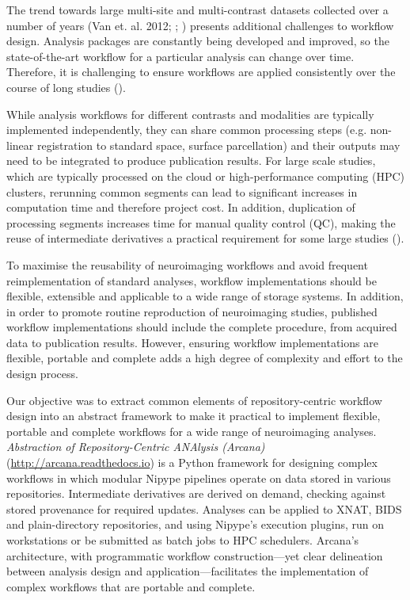 The trend towards large multi-site and multi-contrast datasets collected
over a number of years (Van et. al. 2012; \cite{thompson_enigma_2014};
\cite{sudlow_uk_2015}) presents additional challenges to workflow design.
Analysis packages are constantly being developed and improved, so the
state-of-the-art workflow for a particular analysis can change over
time. Therefore, it is challenging to ensure workflows are applied
consistently over the course of long studies (\cite{cusack_automatic_2015}).

While analysis workflows for different contrasts and modalities are
typically implemented independently, they can share common processing
steps (e.g. non-linear registration to standard space, surface
parcellation) and their outputs may need to be integrated to produce
publication results. For large scale studies, which are typically
processed on the cloud or high-performance computing (HPC) clusters,
rerunning common segments can lead to significant increases in
computation time and therefore project cost. In addition, duplication of
processing segments increases time for manual quality control (QC),
making the reuse of intermediate derivatives a practical requirement for
some large studies (\cite{schreiber_using_2018}).

To maximise the reusability of neuroimaging workflows and avoid frequent
reimplementation of standard analyses, workflow implementations should
be flexible, extensible and applicable to a wide range of storage
systems. In addition, in order to promote routine reproduction of
neuroimaging studies, published workflow implementations should include
the complete procedure, from acquired data to publication results.
However, ensuring workflow implementations are flexible, portable and
complete adds a high degree of complexity and effort to the design
process.

Our objective was to extract common elements of repository-centric
workflow design into an abstract framework to make it practical to
implement flexible, portable and complete workflows for a wide range of
neuroimaging analyses. \emph{Abstraction of Repository-Centric ANAlysis
(Arcana)} \\(\href{http://arcana.readthedocs.io}{http://arcana.readthedocs.io}) is a Python framework for
designing complex workflows in which modular Nipype pipelines operate on
data stored in various repositories. Intermediate derivatives are
derived on demand, checking against stored provenance for required
updates. Analyses can be applied to XNAT, BIDS and plain-directory
repositories, and using Nipype's execution plugins, run on workstations
or be submitted as batch jobs to HPC schedulers. Arcana's architecture,
with programmatic workflow construction---yet clear delineation between
analysis design and application---facilitates the implementation of
complex workflows that are portable and complete.

